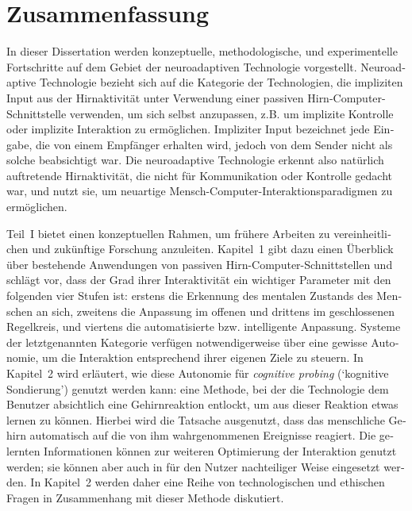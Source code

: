 \documentclass[a4paper,11pt]{article}
\begin{document}
\section*{Zusammenfassung}

\begin{otherlanguage}{ngerman}
In dieser Dissertation werden konzeptuelle, methodologische, und experimentelle Fortschritte auf dem Gebiet der neuroadaptiven Technologie vorgestellt. Neuroadaptive Technologie bezieht sich auf die Kategorie der Technologien, die impliziten Input aus der Hirnaktivität unter Verwendung einer passiven Hirn-Computer-Schnittstelle verwenden, um sich selbst anzupassen, z.B. um implizite Kontrolle oder implizite Interaktion zu ermöglichen. Impliziter Input bezeichnet jede Eingabe, die von einem Empfänger erhalten wird, jedoch von dem Sender nicht als solche beabsichtigt war. Die neuroadaptive Technologie erkennt also natürlich auftretende Hirnaktivität, die nicht für Kommunikation oder Kontrolle gedacht war, und nutzt sie, um neuartige Mensch-Computer-Interaktionsparadigmen zu ermöglichen. 

Teil~I bietet einen konzeptuellen Rahmen, um frühere Arbeiten zu vereinheitlichen und zukünftige Forschung anzuleiten. Kapitel~1 gibt dazu einen Überblick über bestehende Anwendungen von passiven Hirn-Computer-Schnittstellen und schlägt vor, dass der Grad ihrer Interaktivität ein wichtiger Parameter mit den folgenden vier Stufen ist: erstens die Erkennung des mentalen Zustands des Menschen an sich, zweitens die Anpassung im offenen und drittens im geschlossenen Regelkreis, und viertens die automatisierte bzw. intelligente Anpassung. Systeme der letztgenannten Kategorie verfügen notwendigerweise über eine gewisse Autonomie, um die Interaktion entsprechend ihrer eigenen Ziele zu steuern. In Kapitel~2 wird erläutert, wie diese Autonomie für \emph{cognitive probing} (`kognitive Sondierung') genutzt werden kann: eine Methode, bei der die Technologie dem Benutzer absichtlich eine Gehirnreaktion entlockt, um aus dieser Reaktion etwas lernen zu können. Hierbei wird die Tatsache ausgenutzt, dass das menschliche Gehirn automatisch auf die von ihm wahrgenommenen Ereignisse reagiert. Die gelernten Informationen können zur weiteren Optimierung der Interaktion genutzt werden; sie können aber auch in für den Nutzer nachteiliger Weise eingesetzt werden. In Kapitel~2 werden daher eine Reihe von technologischen und ethischen Fragen in Zusammenhang mit dieser Methode diskutiert.


\end{otherlanguage}
\end{document}
